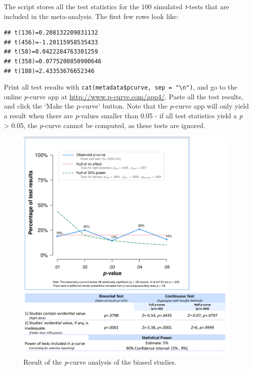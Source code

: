 \documentclass[
  oneside]{krantz}
\begin{document}
The script stores all the test statistics for the 100 simulated \emph{t}-tests that are included in the meta-analysis. The first few rows look like:

\begin{verbatim}
## t(136)=0.208132209831132
## t(456)=-1.20115958535433
## t(58)=0.0422284763301259
## t(358)=0.0775200850900646
## t(188)=2.43353676652346
\end{verbatim}

Print all test results with \texttt{cat(metadata\$pcurve,\ sep\ =\ "\textbackslash{}n")}, and go to the online \emph{p}-curve app at \url{http://www.p-curve.com/app4/}. Paste all the test results, and click the `Make the p-curve' button. Note that the \emph{p}-curve app will only yield a result when there are \emph{p}-values smaller than 0.05 - if all test statistics yield a \emph{p} \textgreater{} 0.05, the \emph{p}-curve cannot be computed, as these tests are ignored.



\begin{figure}

{\centering \includegraphics[width=1\linewidth]{images/pcurveresult} 

}

\caption{Result of the \emph{p}-curve analysis of the biased studies.}\label{fig:pcurveresult}
\end{figure}
\end{document}
